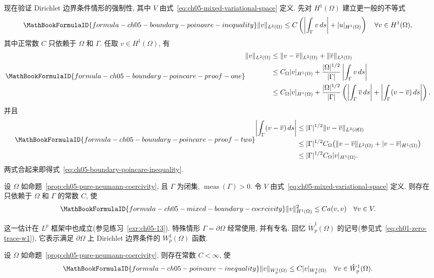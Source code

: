 现在验证 Dirichlet 边界条件情形的强制性, 其中 $V$ 由式~\eqref{eq:ch05-mixed-variational-space} 定义. 先对 $H^1(\Omega)$ 建立更一般的不等式
\begin{equation}
\MathBookFormulaID{formula-ch05-boundary-poincare-inequality}
\label{eq:ch05-boundary-poincare-inequality}
\|v\|_{L^2(\Omega)}
\leq C\left(\left|\int_\Gamma v\,ds\right|+|u|_{H^1(\Omega)}\right)
\quad\forall v\in H^1(\Omega),
\end{equation}
其中正常数 $C$ 只依赖于 $\Omega$ 和 $\Gamma$. 任取 $v\in H^1(\Omega)$, 有
\[
\MathBookFormulaID{formula-ch05-boundary-poincare-proof-one}
\begin{aligned}
\|v\|_{L^2(\Omega)}
&\leq\|v-\overline v\|_{L^2(\Omega)}+\|\overline v\|_{L^2(\Omega)}\\
&\leq C_\Omega|v|_{H^1(\Omega)}
+\frac{|\Omega|^{1/2}}{|\Gamma|}\left|\int_\Gamma v\,ds\right|\\
&\leq C_\Omega|v|_{H^1(\Omega)}
+\frac{|\Omega|^{1/2}}{|\Gamma|}
\left(\left|\int_\Gamma\overline v\,ds\right|
+\left|\int_\Gamma(v-\overline v)\,ds\right|\right),
\end{aligned}
\]
并且
\[
\MathBookFormulaID{formula-ch05-boundary-poincare-proof-two}
\begin{aligned}
\left|\int_\Gamma(v-\overline v)\,ds\right|
&\leq|\Gamma|^{1/2}\|v-\overline v\|_{L^2(\partial\Omega)}\\
&\leq|\Gamma|^{1/2}C_\Omega
\bigl(\|v-\overline v\|_{L^2(\Omega)}+|v-\overline v|_{H^1(\Omega)}\bigr)\\
&\leq|\Gamma|^{1/2}C_\Omega|v|_{H^1(\Omega)}.
\end{aligned}
\]
两式合起来即得式~\eqref{eq:ch05-boundary-poincare-inequality}.

\begin{Proposition}
\label{prop:ch05-mixed-boundary-coercivity}
设 $\Omega$ 如命题~\ref{prop:ch05-pure-neumann-coercivity}, 且 $\Gamma$ 为闭集, $\operatorname{meas}(\Gamma)>0$. 令 $V$ 由式~\eqref{eq:ch05-mixed-variational-space} 定义. 则存在只依赖于 $\Omega$ 和 $\Gamma$ 的常数 $C$, 使
\[
\MathBookFormulaID{formula-ch05-mixed-boundary-coercivity}
\|v\|_{H^1(\Omega)}^2\leq Ca(v,v)\quad\forall v\in V.
\]
\end{Proposition}

这一估计在 $L^p$ 框架中也成立(参见练习~\ref{exr:ch05-13}). 特殊情形 $\Gamma=\partial\Omega$ 经常使用, 并有专名. 回忆 $\mathring W_p^1(\Omega)$ 的记号(参见式~\eqref{eq:ch01-zero-trace-w1}), 它表示满足 $\partial\Omega$ 上 Dirichlet 边界条件的 $W_p^1(\Omega)$ 函数.

\begin{Proposition}
\label{prop:ch05-poincare-inequality}
设 $\Omega$ 如命题~\ref{prop:ch05-pure-neumann-coercivity}. 则存在常数 $C<\infty$, 使
\[
\MathBookFormulaID{formula-ch05-poincare-inequality}
\|v\|_{W_p^1(\Omega)}\leq C|v|_{W_p^1(\Omega)}
\quad\forall v\in\mathring W_p^1(\Omega).
\]
\end{Proposition}
